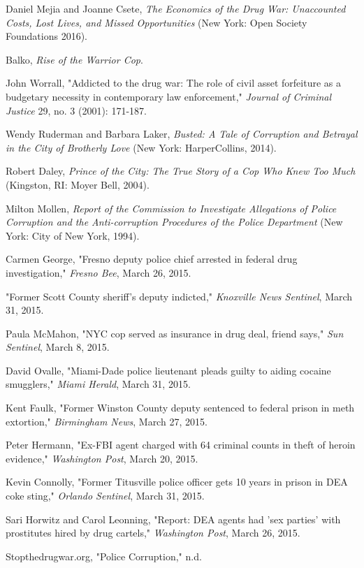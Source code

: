 \documentclass[fontset=fandol, a4paper, 12pt, openright]{ctexbook}
\begin{document}
\begin{enumerate}[label={[\arabic*]}]
    \item Daniel Mejia and Joanne Csete, \textit{The Economics of the Drug War: Unaccounted Costs, Lost Lives, and Missed Opportunities} (New York: Open Society Foundations 2016).
    \item Balko, \textit{Rise of the Warrior Cop}.
    \item John Worrall, "Addicted to the drug war: The role of civil asset forfeiture as a budgetary necessity in contemporary law enforcement," \textit{Journal of Criminal Justice} 29, no. 3 (2001): 171-187.
    \item Wendy Ruderman and Barbara Laker, \textit{Busted: A Tale of Corruption and Betrayal in the City of Brotherly Love} (New York: HarperCollins, 2014).
    \item Robert Daley, \textit{Prince of the City: The True Story of a Cop Who Knew Too Much} (Kingston, RI: Moyer Bell, 2004).
    \item Milton Mollen, \textit{Report of the Commission to Investigate Allegations of Police Corruption and the Anti-corruption Procedures of the Police Department} (New York: City of New York, 1994).
    \item Carmen George, "Fresno deputy police chief arrested in federal drug investigation," \textit{Fresno Bee}, March 26, 2015.
    \item "Former Scott County sheriff's deputy indicted," \textit{Knoxville News Sentinel}, March 31, 2015.
    \item Paula McMahon, "NYC cop served as insurance in drug deal, friend says," \textit{Sun Sentinel}, March 8, 2015.
    \item David Ovalle, "Miami-Dade police lieutenant pleads guilty to aiding cocaine smugglers," \textit{Miami Herald}, March 31, 2015.
    \item Kent Faulk, "Former Winston County deputy sentenced to federal prison in meth extortion," \textit{Birmingham News}, March 27, 2015.
    \item Peter Hermann, "Ex-FBI agent charged with 64 criminal counts in theft of heroin evidence," \textit{Washington Post}, March 20, 2015.
    \item Kevin Connolly, "Former Titusville police officer gets 10 years in prison in DEA coke sting," \textit{Orlando Sentinel}, March 31, 2015.
    \item Sari Horwitz and Carol Leonning, "Report: DEA agents had 'sex parties' with prostitutes hired by drug cartels," \textit{Washington Post}, March 26, 2015.
    \item Stopthedrugwar.org, "Police Corruption," n.d.

\end{enumerate}
\end{document}
